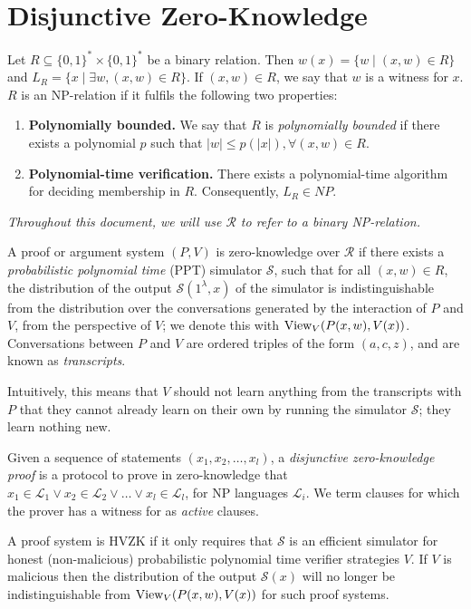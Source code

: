 \section{Disjunctive Zero-Knowledge}

\begin{definition}[NP Relations]
Let $R \subseteq \{0,1\}^* \times \{0,1\}^*$ be a binary relation. Then $w(x) = \{w \mid (x,w) \in R\}$ and $L_R = \{x \mid \exists w, (x,w) \in R\}$. If $(x,w) \in R$, we say that $w$ is a witness for $x$. $R$ is an NP-relation if it fulfils the following two properties:
\begin{enumerate}
    \item \textbf{Polynomially bounded.} We say that $R$ is \textit{polynomially bounded} if there exists a polynomial $p$ such that $|w| \le p(|x|), \forall (x,w) \in R$. 
    \item \textbf{Polynomial-time verification.} There exists a polynomial-time algorithm for deciding membership in $R$. Consequently, $L_R \in NP$. 
\end{enumerate}

\textit{Throughout this document, we will use $\mathcal R$ to refer to a binary NP-relation.}
\end{definition}

\begin{definition}\label{def:zeroknowledge}
A proof or argument system $(P,V)$ is zero-knowledge over $\mathcal R$ if there exists a \textit{probabilistic polynomial time} (PPT) simulator $\mathcal S$, such that for all $(x,w) \in R$, the distribution of the output $\mathcal S(1^\lambda, x)$ of the simulator is indistinguishable from the distribution over the conversations generated by the interaction of $P$ and $V$, from the perspective of $V$; we denote this with $\text{View}_V(P(x,w),V(x))$. Conversations between $P$ and $V$ are ordered triples of the form $(a,c,z)$, and are known as \textit{transcripts}.
\end{definition}

Intuitively, this means that $V$ should not learn anything from the transcripts  with $P$ that they cannot already learn on their own by running the simulator $\mathcal S$; they learn nothing new.

\begin{definition}
Given a sequence of statements $(x_1,x_2,\ldots, x_l)$, a \textit{disjunctive zero-knowledge proof} is a protocol to 
prove in zero-knowledge that $x_1 \in \mathcal L_1 \lor x_2 \in \mathcal L_2 \lor \ldots \lor x_l \in \mathcal L_l$, for 
NP languages $\mathcal L_i$. We term clauses for which the prover has a witness for as \textit{active} clauses. 
\end{definition}

\begin{definition}\label{def:hvzk}
A proof system is HVZK if it only requires that $\mathcal S$ is an efficient simulator 
for honest (non-malicious) probabilistic polynomial time verifier strategies $V$. If $V$ is malicious then the distribution 
of the output $\mathcal S(x)$ will no longer be indistinguishable from $\text{View}_V(P(x,w),V(x))$ for such proof systems. 
\end{definition}
